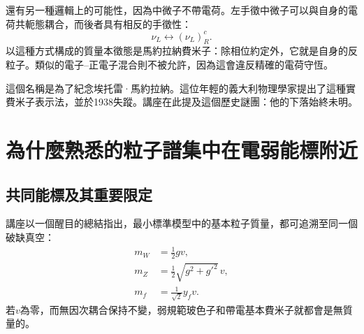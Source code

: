 還有另一種邏輯上的可能性，因為中微子不帶電荷。左手徵中微子可以與自身的電荷共軛態耦合，而後者具有相反的手徵性：
\begin{equation}
  \nu_L\longleftrightarrow(\nu_L)^c_R .
  \label{eq:l09-majorana-mixing}
\end{equation}
以這種方式構成的質量本徵態是馬約拉納費米子：除相位約定外，它就是自身的反粒子。類似的電子--正電子混合則不被允許，因為這會違反精確的電荷守恆。

\begin{classroomqa}
\end{classroomqa}

這個名稱是為了紀念埃托雷·馬約拉納。這位年輕的義大利物理學家提出了這種實費米子表示法，並於1938失蹤。講座在此提及這個歷史謎團：他的下落始終未明。

\section{為什麼熟悉的粒子譜集中在電弱能標附近}

\subsection{共同能標及其重要限定}

\begin{classroomqa}
\end{classroomqa}

講座以一個醒目的總結指出，最小標準模型中的基本粒子質量，都可追溯至同一個破缺真空：
\begin{align}
  m_W&=\frac12gv,\\
  m_Z&=\frac12\sqrt{g^2+g'^2}\,v,\\
  m_f&=\frac1{\sqrt2}y_fv.
  \label{eq:l09-electroweak-mass-summary}
\end{align}
若\(v\)為零，而無因次耦合保持不變，弱規範玻色子和帶電基本費米子就都會是無質量的。

